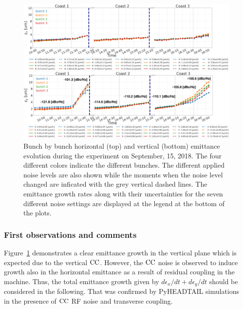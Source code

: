 \begin{figure}
   \centering
   \includegraphics[width=1.0\textwidth]{images/Ch5/MD5_overview_x_y.png}
   \caption{Bunch by bunch horizontal (top) and vertical (bottom) emittance evolution during the experiment on September, 15, 2018. The four different colors indicate the different bunches. The different applied noise levels are also shown while the moments when the noise level changed are inficated with the grey vertical dashed lines. The emittance growth rates along with their uncertainties for the seven different noise settings are displayed at the legend at the bottom of the plots.}
   \label{fig:MD5_overview_x_y}
\end{figure}
   
\subsubsection*{First observations and comments}
Figure~\ref{fig:MD5_overview_x_y} demonstrates a clear emittance growth in the vertical plane which is expected due to the vertical ${\mathrm{CC}}$. However, the ${\mathrm{CC}}$ noise is observed to induce growth also in the horizontal emittance as a result of residual coupling in the machine. Thus, the total emittance growth given by $d\epsilon_x/dt + d\epsilon_y/dt$ should be considered in the following. That was confirmed by PyHEADTAIL simulations~\cite{Baudrenghien_HL-LHC19v6} in the presence of ${\mathrm{CC}}$ RF noise and transverse coupling. 


